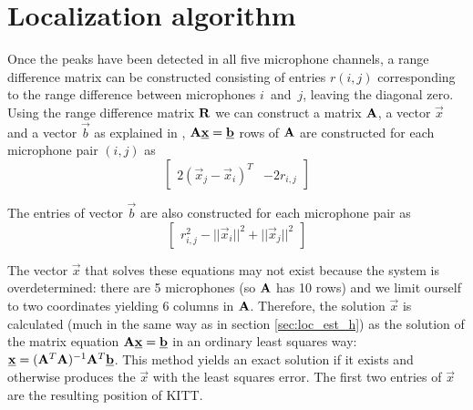 \documentclass[11pt,titlepage]{report}
\begin{document}
\section{Localization algorithm}
\label{sec:loc_alg}
Once the peaks have been detected in all five microphone channels, a range difference matrix can be constructed consisting of entries $r(i,j)$ corresponding to the range difference between microphones $i$~and~$j$, leaving the diagonal zero. 
Using the range difference matrix $\mathbf{R}$ we can construct a matrix $\mathbf{A}$, a vector $\vec{x}$ and a vector $\vec{b}$ as explained in \cite{epo4-manual}, $\mathbf{A}\mathbf{\underline{x}}=\mathbf{\underline{b}}$ rows of $\mathbf{A}$ are constructed for each microphone pair $(i,j)$ as
\begin{equation}
\begin{bmatrix}
2(\vec{x}_j-\vec{x}_i)^T & -2r_{i,j}
\end{bmatrix}
\end{equation}

The entries of vector $\vec{b}$ are also constructed for each microphone pair as
\begin{equation}
\begin{bmatrix}
r_{i,j}^2-||\vec{x}_i||^2+||\vec{x}_j||^2
\end{bmatrix}
\end{equation}

The vector $\vec{x}$ that solves these equations may not exist because the system is overdetermined: there are \num{5} microphones (so $\mathbf{A}$ has \num{10} rows) and we limit ourself to two coordinates yielding \num{6} columns in $\mathbf{A}$. Therefore, the solution $\vec{x}$ is calculated (much in the same way as in section \ref{sec:loc_est_h}) as the solution of the matrix equation $\mathbf{A}\mathbf{\underline{x}}=\mathbf{\underline{b}}$ in an ordinary least squares way: $\mathbf{\underline{x}}=(\mathbf{A}^T\mathbf{A})^{-1}\mathbf{A}^T\mathbf{\underline{b}}$. This method yields an exact solution if it exists and otherwise produces the $\vec{x}$ with the least squares error. The first two entries of $\vec{x}$ are the resulting position of KITT. 
\end{document}
